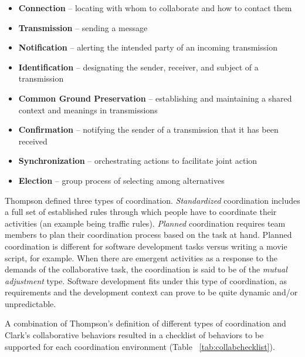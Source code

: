 \documentclass[conference]{IEEEtran}
\begin{document}
\begin{itemize}
\item \textbf{Connection} -- locating with whom to collaborate and how to contact them
\item \textbf{Transmission} -- sending a message
\item \textbf{Notification} -- alerting the intended party of an incoming transmission
\item \textbf{Identification} -- designating the sender, receiver, and subject of a transmission
\item \textbf{Common Ground Preservation} -- establishing and maintaining a shared context and meanings in transmissions
\item \textbf{Confirmation} -- notifying the sender of a transmission that it has been received
\item \textbf{Synchronization} -- orchestrating actions to facilitate joint action
\item \textbf{Election} -- group process of selecting among alternatives
\end{itemize}

Thompson \cite{Thompson67} defined three types of coordination. \textit{Standardized} coordination includes a full set of established rules through which people have to coordinate their activities (an example being traffic rules). \textit{Planned} coordination requires team members to plan their coordination process based on the task at hand. Planned coordination is different for software development tasks versus writing a movie script, for example. When there are emergent activities as a response to the demands of the collaborative task, the coordination is said to be of the \textit{mutual adjustment} type. Software development fits under this type of coordination, as requirements and the development context can prove to be quite dynamic and/or unpredictable.

A combination of Thompson's \cite{Thompson67} definition of different types of coordination and Clark's \cite{Clark96} collaborative behaviors resulted in a checklist of behaviors to be supported for each coordination environment (Table ~\ref{tab:collabchecklist}).
\end{document}

